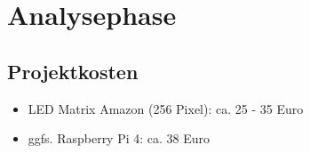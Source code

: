 \clearpage
\section{Analysephase} 
\label{sec:Analysephase}
%
%
%

%
%


\subsection{Projektkosten}
\label{sec:Projektkosten}
\begin{itemize}
	\item LED Matrix Amazon (256 Pixel): ca. 25 - 35 Euro
	\item ggfs. Raspberry Pi 4: ca. 38 Euro
\end{itemize}

